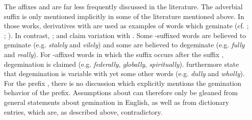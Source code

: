 The affixes  and  are far less frequently discussed in the literature. 
The adverbial suffix  is only mentioned implicitly in some of the literature mentioned above. In those works, derivatives with  are used as examples of words which geminate (cf. \citealt[141]{Wijk.1966}; \citealt[23]{Harris.1994}; \citealt[22]{Spencer.1996}). In contrast, \citet[82]{Bauer.2001}; \citet[353]{Giegerich.2012} and \citet[169]{Bauer.2013} claim variation with . Some -suffixed words are believed to geminate (e.g. \textit{stalely} and \textit{vilely}) and some are believed to {degeminate} (e.g. \textit{fully} and \textit{really}). For -affixed words in which the suffix occurs after the suffix , {degemination} is claimed (e.g.  \textit{federally}, \textit{globally}, \textit{spiritually}). \citet[169]{Bauer.2013} furthermore state that {degemination} is variable with yet some other words (e.g. \textit{dully} and \textit{wholly}). 
For the prefix , there is no discussion which explicitly mentions the gemination behavior of the prefix. Assumptions about  can therefore only be gleaned from general statements about gemination in English, as well as from dictionary entries, which are, as described above, contradictory. 

